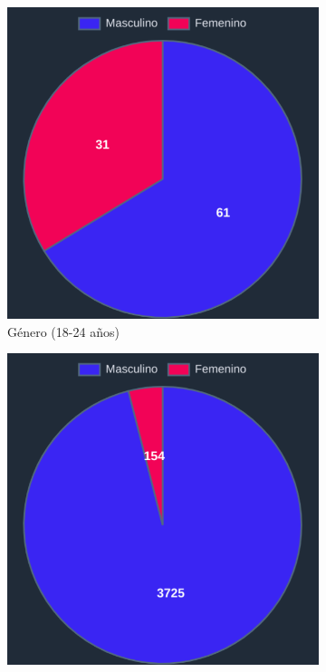 \begin{figure}[H]
\begin{subfigure}{0.3\textwidth}
   \includegraphics[width=\textwidth]{imaxes/capturas-app/graficos/grivas/grafico-genero-jj.png}
  \caption{Género (18-24 años)}
  \end{subfigure}
  \begin{subfigure}{0.3\textwidth}
   \includegraphics[width=\textwidth]{imaxes/capturas-app/graficos/grivas/grafico-genero-j.png}

\end{subfigure}
\end{figure}
